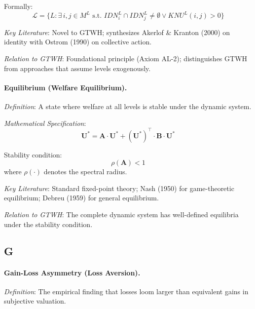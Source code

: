 \documentclass[12pt,a4paper]{article}
\begin{document}
Formally:
\begin{equation}
\mathcal{L} = \{L : \exists \, i,j \in M^L \text{ s.t. } IDN^L_i \cap IDN^L_j \neq \emptyset \lor KNU^L(i,j) > 0\}
\end{equation}

\textit{Key Literature}: Novel to GTWH; synthesizes Akerlof \& Kranton (2000) 
on identity with Ostrom (1990) on collective action.

\textit{Relation to GTWH}: Foundational principle (Axiom AL-2); distinguishes 
GTWH from approaches that assume levels exogenously.

\medskip

\paragraph{Equilibrium (Welfare Equilibrium).}
\textit{Definition}: A state where welfare at all levels is stable under the 
dynamic system.

\textit{Mathematical Specification}:
\begin{equation}
\mathbf{U}^* = \mathbf{A} \cdot \mathbf{U}^* + (\mathbf{U}^*)^\top \cdot \mathbf{B} \cdot \mathbf{U}^*
\end{equation}

Stability condition:
\begin{equation}
\rho(\mathbf{A}) < 1
\end{equation}
where $\rho(\cdot)$ denotes the spectral radius.

\textit{Key Literature}: Standard fixed-point theory; Nash (1950) for game-theoretic 
equilibrium; Debreu (1959) for general equilibrium.

\textit{Relation to GTWH}: The complete dynamic system has well-defined equilibria 
under the stability condition.

\subsection*{G}

\paragraph{Gain-Loss Asymmetry (Loss Aversion).}
\textit{Definition}: The empirical finding that losses loom larger than equivalent 
gains in subjective valuation.
\end{document}

